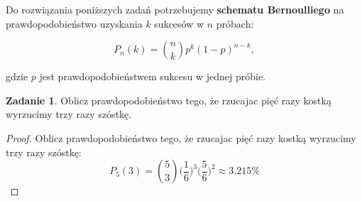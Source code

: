 \documentclass[11pt]{article}
\theoremstyle{definition}
\newtheorem{zadanie}{Zadanie}
\numberwithin{zadanie}{section}
\begin{document}
Do rozwiązania poniższych zadań potrzebujemy \textbf{schematu Bernoulliego} na prawdopodobieństwo uzyskania $k$ sukcesów w $n$ próbach:

$$P_n(k) = \binom nk p^k(1-p)^{n-k},$$

gdzie $p$ jest prawdopodobieństwem sukcesu w jednej próbie.

\begin{zadanie} Oblicz prawdopodobieństwo tego, że rzucajac pięć razy kostką wyrzucimy trzy razy szóstkę.\end{zadanie}

\begin{proof}
    Oblicz prawdopodobieństwo tego, że rzucajac pięć razy kostką wyrzucimy trzy razy szóstkę:
    $$P_5(3) = \binom 53 \Bigg(\frac16\Bigg)^3\Bigg(\frac56\Bigg)^2 \approx 3.215\% $$
\end{proof}
\end{document}

